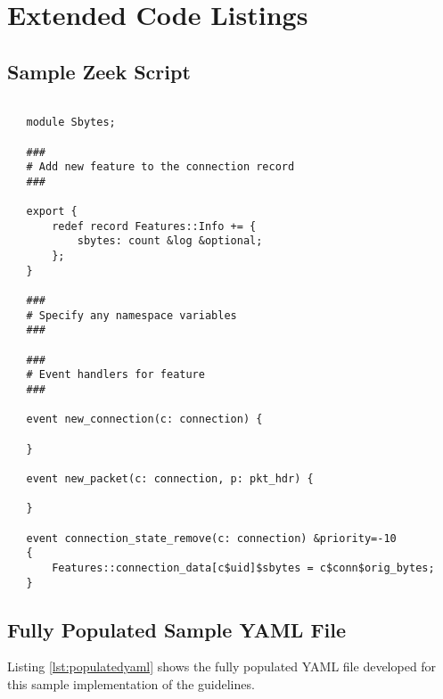 \documentclass[sigconf, anonymous, screen, review]{acmart}
\begin{document}
\section{Extended Code Listings}

\begin{minipage}{\linewidth}
\subsection{Sample Zeek Script}
\begin{lstlisting}[label=lst:zeeksamplescript, caption={
    A sample Zeek script that creates the single feature for source bytes.
    This script would be identified in a $\_\_load\_\_.zeek$ file and executed using the Zeek wrapper script provided by our sample implementation.
    Each script provides the feature name and implements supported Zeek callback functions.
    While we provide a default set of callbacks, others could  be added to this file if needed.
    One can see that breaking up the features into their own code unit makes understanding how they are generated straightforward.
    }, captionpos=b, basicstyle=\small, backgroundcolor=\color{gray!10!white}, frame=stb, breaklines=True]

   module Sbytes;
   
   ###
   # Add new feature to the connection record
   ###
   
   export {
       redef record Features::Info += {
           sbytes: count &log &optional;
       };
   }
   
   ###
   # Specify any namespace variables
   ###
   
   ###
   # Event handlers for feature
   ###
   
   event new_connection(c: connection) {
   
   }
   
   event new_packet(c: connection, p: pkt_hdr) {
   
   }
   
   event connection_state_remove(c: connection) &priority=-10
   {
       Features::connection_data[c$uid]$sbytes = c$conn$orig_bytes;
   }
\end{lstlisting}
\end{minipage}

\subsection{Fully Populated Sample YAML File}
Listing \ref{lst:populatedyaml} shows the fully populated YAML file developed for this sample implementation of the guidelines.
\end{document}
